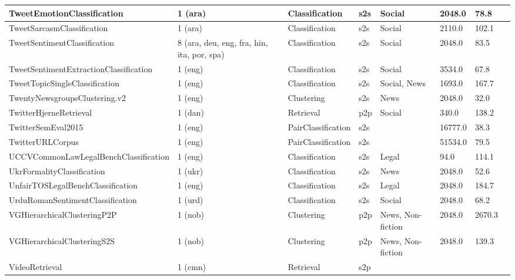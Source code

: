 \begin{longtable}{L{5.0cm}|L{1.5cm}L{1.4cm}L{1.4cm}L{1.4cm}L{1.4cm}L{1.0cm}L{1.0cm}}
 \hline 
TweetEmotionClassification \cite{al2018emotional} & 1 (ara) & Classification & s2s & Social & 2048.0 & 78.8 \\
 \hline 
TweetSarcasmClassification \cite{abu-farha-magdy-2020-arabic} & 1 (ara) & Classification & s2s & Social & 2110.0 & 102.1 \\
 \hline 
TweetSentimentClassification \cite{barbieri-etal-2022-xlm} & 8 (ara, deu, eng, fra, hin, ita, por, spa) & Classification & s2s & Social & 2048.0 & 83.5 \\
 \hline 
TweetSentimentExtractionClassification \cite{tweet-sentiment-extraction} & 1 (eng) & Classification & s2s & Social & 3534.0 & 67.8 \\
 \hline 
TweetTopicSingleClassification \cite{dimosthenis-etal-2022-twitter} & 1 (eng) & Classification & s2s & Social, News & 1693.0 & 167.7 \\
 \hline 
TwentyNewsgroupsClustering.v2 \cite{LANG1995331} & 1 (eng) & Clustering & s2s & News & 2048.0 & 32.0 \\
 \hline 
TwitterHjerneRetrieval \cite{holm2024gllms} & 1 (dan) & Retrieval & p2p & Social & 340.0 & 138.2 \\
 \hline 
TwitterSemEval2015 \cite{xu-etal-2015-semeval} & 1 (eng) & PairClassification & s2s &  & 16777.0 & 38.3 \\
 \hline 
TwitterURLCorpus \cite{lan-etal-2017-continuously} & 1 (eng) & PairClassification & s2s &  & 51534.0 & 79.5 \\
 \hline 
UCCVCommonLawLegalBenchClassification \cite{guha2023legalbench} & 1 (eng) & Classification & s2s & Legal & 94.0 & 114.1 \\
 \hline 
UkrFormalityClassification \cite{rao-tetreault-2018-dear} & 1 (ukr) & Classification & s2s & News & 2048.0 & 52.6 \\
 \hline 
UnfairTOSLegalBenchClassification \cite{guha2023legalbench} & 1 (eng) & Classification & s2s & Legal & 2048.0 & 184.7 \\
 \hline 
UrduRomanSentimentClassification \cite{misc_roman_urdu_data_set_458} & 1 (urd) & Classification & s2s & Social & 2048.0 & 68.2 \\
 \hline 
VGHierarchicalClusteringP2P \cite{navjord2023beyond} & 1 (nob) & Clustering & p2p & News, Non-fiction & 2048.0 & 2670.3 \\
 \hline 
VGHierarchicalClusteringS2S \cite{navjord2023beyond} & 1 (nob) & Clustering & p2p & News, Non-fiction & 2048.0 & 139.3 \\
 \hline 
VideoRetrieval  & 1 (cmn) & Retrieval & s2p &  &  &  \\

\end{longtable}
